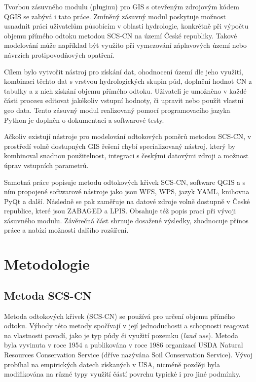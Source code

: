 \documentclass[a4paper,oneside,12pt]{book}
\begin{document}
Tvorbou zásuvného modulu (pluginu) pro GIS s otevřeným zdrojovým kódem QGIS se zabývá i tato práce. Zmíněný zásuvný modul poskytuje možnost usnadnit práci uživatelům působícím v oblasti hydrologie, konkrétně při výpočtu objemu přímého odtoku metodou SCS-CN na území České republiky. Takové modelování může například být využito při vymezování záplavových území nebo návrzích protipovodňových opatření.

Cílem bylo vytvořit nástroj pro získání dat, ohodnocení území dle jeho využití, kombinaci těchto dat s vrstvou hydrologických skupin půd, doplnění hodnot CN z tabulky a z nich získání objemu přímého odtoku. Uživateli je umožněno v každé části procesu editovat jakékoliv vstupní hodnoty, či upravit nebo použít vlastní geo data. Tento zásuvný modul realizovaný pomocí programovacího jazyka Python je doplněn o dokumentaci a softwarové testy. 

Ačkoliv existují nástroje pro modelování odtokových poměrů metodou SCS-CN, v prostředí volně dostupných GIS řešení chybí specializovaný nástroj, který by kombinoval snadnou použitelnost, integraci s českými datovými zdroji a možnost úprav vstupních parametrů.

Samotná práce popisuje metodu odtokových křivek SCS-CN, software QGIS a s ním propojené softwarové nástroje jako jsou WFS, WPS, jazyk YAML, knihovna PyQt a další. Následně se pak zaměřuje na  datové zdroje volně dostupně v České republice, které jsou ZABAGED a LPIS. Obsahuje též popis prací při vývoji zásuvného modulu. Závěrečná část shrnuje dosažené výsledky, zhodnocuje přínos práce a nabízí možnosti dalšího rozšíření.


\chapter{Metodologie}

\section{Metoda SCS-CN} \label{SCSCN}
\hspace{10mm} Metoda odtokových křivek (SCS-CN) se používá pro určení objemu přímého odtoku. Výhody této metody spočívají v její jednoduchosti a schopnosti reagovat na vlastnosti povodí, jako je typ půdy či využití pozemku (\textit{land use}). Metoda byla vyvinuta v roce 1954 a publikována v roce 1986 organizací USDA Natural Resources Conservation Service (dříve nazývána Soil Conservation Service). \cite{MNYDGwleJOjKLRUp} Vývoj probíhal na empirických datech získaných v USA, nicméně později byla modifikována na různé typy využití částí povrchu typické i pro jiné podmínky. \cite{Holman2003}\cite{Lian2020}
\end{document}
